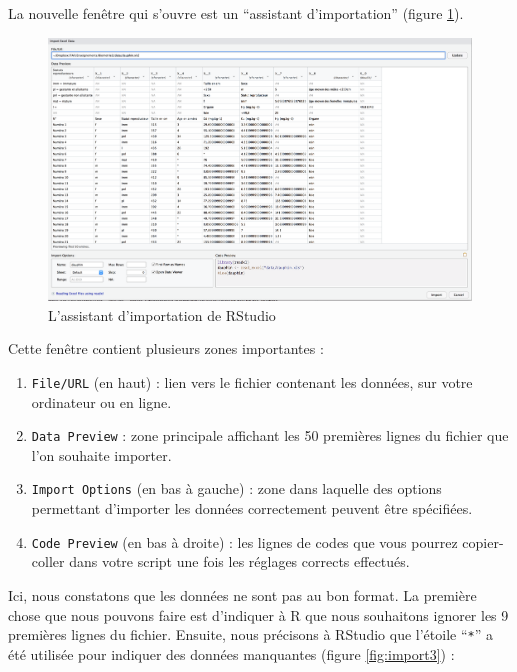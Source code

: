 \documentclass[
  a4paper,
]{article}
\providecommand{\tightlist}{%
  \setlength{\itemsep}{0pt}\setlength{\parskip}{0pt}}
\begin{document}
La nouvelle fenêtre qui s'ouvre est un ``assistant d'importation'' (figure \ref{fig:import2}).

\begin{figure}[htpb]

{\centering \includegraphics[width=1\linewidth]{images/import2} 

}

\caption{L'assistant d'importation de RStudio}\label{fig:import2}
\end{figure}

Cette fenêtre contient plusieurs zones importantes :

\begin{enumerate}
\def\labelenumi{\arabic{enumi}.}
\tightlist
\item
  \texttt{File/URL} (en haut) : lien vers le fichier contenant les données, sur votre ordinateur ou en ligne.
\item
  \texttt{Data\ Preview} : zone principale affichant les 50 premières lignes du fichier que l'on souhaite importer.
\item
  \texttt{Import\ Options} (en bas à gauche) : zone dans laquelle des options permettant d'importer les données correctement peuvent être spécifiées.
\item
  \texttt{Code\ Preview} (en bas à droite) : les lignes de codes que vous pourrez copier-coller dans votre script une fois les réglages corrects effectués.
\end{enumerate}

Ici, nous constatons que les données ne sont pas au bon format. La première chose que nous pouvons faire est d'indiquer à R que nous souhaitons ignorer les 9 premières lignes du fichier. Ensuite, nous précisons à RStudio que l'étoile ``\texttt{*}'' a été utilisée pour indiquer des données manquantes (figure \ref{fig:import3}) :
\end{document}
